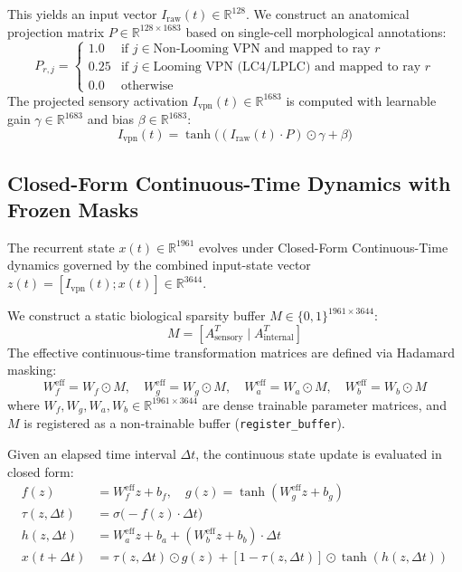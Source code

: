 \documentclass{article}
\begin{document}
This yields an input vector $I_{\text{raw}}(t) \in \mathbb{R}^{128}$. We construct an anatomical projection matrix $P \in \mathbb{R}^{128 \times 1683}$ based on single-cell morphological annotations:
\begin{equation}
P_{r, j} = \begin{cases}
1.0 & \text{if } j \in \text{Non-Looming VPN and mapped to ray } r \\
0.25 & \text{if } j \in \text{Looming VPN (LC4/LPLC) and mapped to ray } r \\
0.0 & \text{otherwise}
\end{cases}
\end{equation}
The projected sensory activation $I_{\text{vpn}}(t) \in \mathbb{R}^{1683}$ is computed with learnable gain $\gamma \in \mathbb{R}^{1683}$ and bias $\beta \in \mathbb{R}^{1683}$:
\begin{equation}
I_{\text{vpn}}(t) = \tanh\Big((I_{\text{raw}}(t) \cdot P) \odot \gamma + \beta\Big)
\end{equation}

\subsection{Closed-Form Continuous-Time Dynamics with Frozen Masks}
The recurrent state $x(t) \in \mathbb{R}^{1961}$ evolves under Closed-Form Continuous-Time dynamics governed by the combined input-state vector $z(t) = [I_{\text{vpn}}(t); x(t)] \in \mathbb{R}^{3644}$.

We construct a static biological sparsity buffer $M \in \{0, 1\}^{1961 \times 3644}$:
\begin{equation}
M = [A_{\text{sensory}}^T \;|\; A_{\text{internal}}^T]
\end{equation}
The effective continuous-time transformation matrices are defined via Hadamard masking:
\begin{equation}
W_f^{\text{eff}} = W_f \odot M, \quad W_g^{\text{eff}} = W_g \odot M, \quad W_a^{\text{eff}} = W_a \odot M, \quad W_b^{\text{eff}} = W_b \odot M
\end{equation}
where $W_f, W_g, W_a, W_b \in \mathbb{R}^{1961 \times 3644}$ are dense trainable parameter matrices, and $M$ is registered as a non-trainable buffer (\texttt{register\_buffer}).

Given an elapsed time interval $\Delta t$, the continuous state update is evaluated in closed form:
\begin{align}
f(z) &= W_f^{\text{eff}} z + b_f, \quad g(z) = \tanh(W_g^{\text{eff}} z + b_g) \\
\tau(z, \Delta t) &= \sigma\Big(-f(z) \cdot \Delta t\Big) \\
h(z, \Delta t) &= W_a^{\text{eff}} z + b_a + (W_b^{\text{eff}} z + b_b) \cdot \Delta t \\
x(t + \Delta t) &= \tau(z, \Delta t) \odot g(z) + [1 - \tau(z, \Delta t)] \odot \tanh(h(z, \Delta t))
\end{align}
\end{document}
